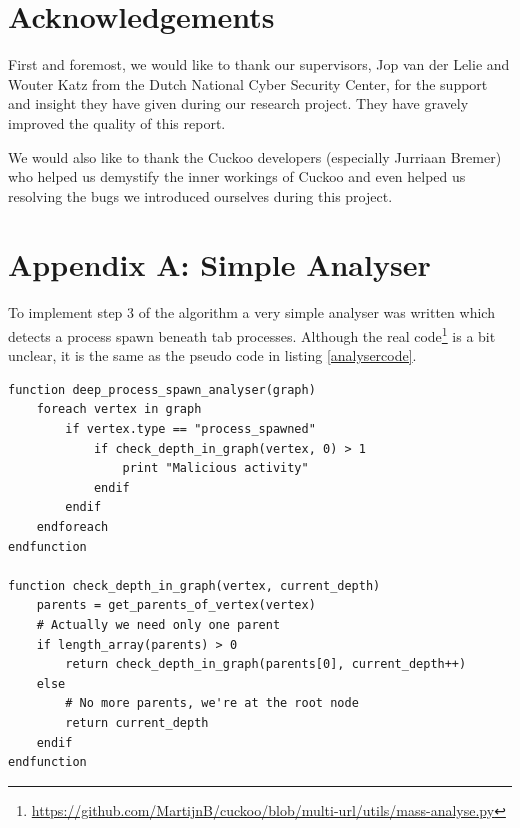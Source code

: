 \documentclass{scrartcl}
\begin{document}
\clearpage

\section*{Acknowledgements}

First and foremost, we would like to thank our supervisors, Jop van der Lelie and Wouter Katz from the Dutch National Cyber Security Center, for the support and insight they have given during our research project. They have gravely improved the quality of this report.

We would also like to thank the Cuckoo developers (especially Jurriaan Bremer) who helped us demystify the inner workings of Cuckoo and even helped us resolving the bugs we introduced ourselves during this project.

\clearpage





\clearpage

\section*{Appendix A: Simple Analyser}

To implement step 3 of the algorithm a very simple analyser was written which detects a process spawn beneath tab processes. Although the real code\footnote{\url{https://github.com/MartijnB/cuckoo/blob/multi-url/utils/mass-analyse.py}} is a bit unclear, it is the same as the pseudo code in listing \ref{analysercode}.

\begin{lstlisting}[caption={Pseudo code for phase 3 of the algorithm},label={analysercode}]
function deep_process_spawn_analyser(graph)
    foreach vertex in graph
        if vertex.type == "process_spawned"
            if check_depth_in_graph(vertex, 0) > 1
                print "Malicious activity"
            endif
        endif
    endforeach
endfunction

function check_depth_in_graph(vertex, current_depth)
    parents = get_parents_of_vertex(vertex)
    # Actually we need only one parent
    if length_array(parents) > 0
        return check_depth_in_graph(parents[0], current_depth++)
    else
        # No more parents, we're at the root node
        return current_depth
    endif
endfunction
\end{lstlisting}
\end{document}
